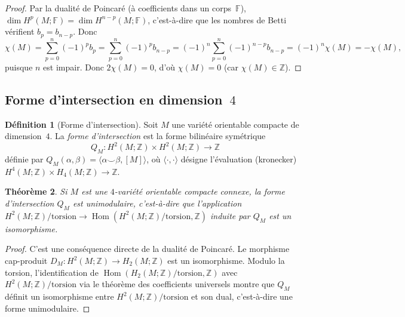 \documentclass[12pt,a4paper,openany]{book}
\theoremstyle{definition}
\newtheorem{definition}{Définition}[chapter]
\theoremstyle{plain}
\newtheorem{theoreme}[definition]{Théorème}
\theoremstyle{remark}
\newcommand{\Z}{\mathbb{Z}}
\DeclareMathOperator{\Hom}{Hom}
\begin{document}
\begin{proof}
  Par la dualité de Poincaré (à coefficients dans un corps~$\mathbb{F}$),
  $\dim H^p(M; \mathbb{F}) = \dim H^{n-p}(M; \mathbb{F})$, c'est-à-dire
  que les nombres de Betti vérifient $b_p = b_{n-p}$. Donc
  \[
    \chi(M) = \sum_{p=0}^{n} (-1)^p b_p
    = \sum_{p=0}^{n} (-1)^p b_{n-p}
    = (-1)^n \sum_{p=0}^{n} (-1)^{n-p} b_{n-p}
    = (-1)^n \chi(M)
    = -\chi(M),
  \]
  puisque $n$ est impair. Donc $2\chi(M) = 0$, d'où $\chi(M) = 0$ (car
  $\chi(M) \in \Z$).
\end{proof}

\subsection{Forme d'intersection en dimension~$4$}\label{subsec:forme-intersection}

\begin{definition}[Forme d'intersection]\label{def:forme-intersection}
  Soit $M$ une variété orientable compacte de dimension~$4$. La \emph{forme
  d'intersection} est la forme bilinéaire symétrique
  \[
    Q_M \colon H^2(M; \Z) \times H^2(M; \Z) \longrightarrow \Z
  \]
  définie par $Q_M(\alpha, \beta) = \langle \alpha \smile \beta, [M] \rangle$,
  où $\langle \cdot, \cdot \rangle$ désigne l'évaluation (kronecker)
  $H^4(M; \Z) \times H_4(M; \Z) \to \Z$.
\end{definition}

\begin{theoreme}\label{thm:forme-intersection-unimod}
  Si $M$ est une $4$-variété orientable compacte connexe, la forme d'intersection
  $Q_M$ est unimodulaire, c'est-à-dire que l'application
  $H^2(M; \Z)/\mathrm{torsion} \to \Hom(H^2(M; \Z)/\mathrm{torsion}, \Z)$
  induite par $Q_M$ est un isomorphisme.
\end{theoreme}

\begin{proof}
  C'est une conséquence directe de la dualité de Poincaré. Le morphisme cap-produit
  $D_M \colon H^2(M; \Z) \to H_2(M; \Z)$ est un isomorphisme. Modulo la torsion,
  l'identification de $\Hom(H_2(M; \Z)/\mathrm{torsion}, \Z)$ avec
  $H^2(M; \Z)/\mathrm{torsion}$ via le théorème des coefficients universels montre
  que $Q_M$ définit un isomorphisme entre $H^2(M; \Z)/\mathrm{torsion}$ et son dual,
  c'est-à-dire une forme unimodulaire.
\end{proof}
\end{document}
